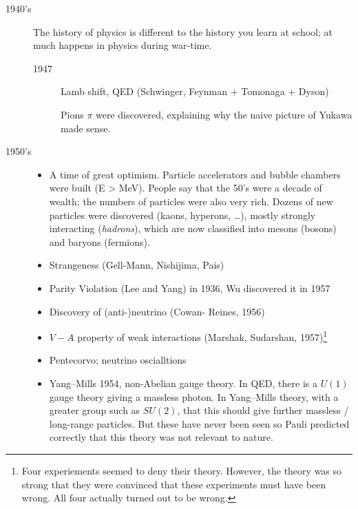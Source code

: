 \begin{description}
  \item[1940's] The history of physics is different to the history you learn at school; at much happens in physics during war-time.
    \begin{description}
      \item[1947] Lamb shift, QED (Schwinger, Feynman + Tomonaga + Dyson)\par Pions $\pi$ were discovered, explaining why the naive picture of Yukawa made sense.
    \end{description}
  \item[1950's] 
    \begin{itemize}
      \item A time of great optimism. Particle accelerators and bubble chambers were built (E > MeV).
    People say that the 50's were a decade of wealth; the numbers of particles were also very rich. Dozens of new particles were discovered (kaons, hyperons, \dots), mostly strongly interacting (\emph{hadrons}), which are now classified into mesons (bosons) and baryons (fermions).
    \item Strangeness (Gell-Mann, Nishijima, Pais)
    \item Parity Violation (Lee and Yang) in 1936, Wu discovered it in 1957
    \item Discovery of (anti-)neutrino (Cowan- Reines, 1956)
    \item $V-A$ property of weak interactions (Marshak, Sudarshan, 1957)\footnote{Four experiements seemed to deny their theory. However, the theory was so strong that they were convinced that these experiments must have been wrong. All four actually turned out to be wrong.}
    \item Pentecorvo; neutrino oscialltions
    \item Yang--Mills 1954, non-Abelian gauge theory.
      In QED, there is a $U(1)$ gauge theory giving a massless photon.
      In Yang--Mills theory, with a greater group such as $SU(2)$, that this should give further massless / long-range particles. But these have never been seen so Pauli predicted correctly that this theory was not relevant to nature.
    \end{itemize}

\end{description}
